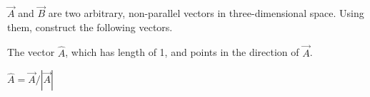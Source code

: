 $\overrightarrow{A}$ and $\overrightarrow{B}$ are two arbitrary, non-parallel vectors in three-dimensional space. Using them, construct the following vectors.

The vector $\hat{A}$, which has length of 1, and points in the direction of $\overrightarrow{A}$.

\begin{solution}
    $\hat{A} = \overrightarrow{A} / \left|\overrightarrow{A}\right|$
\end{solution}
